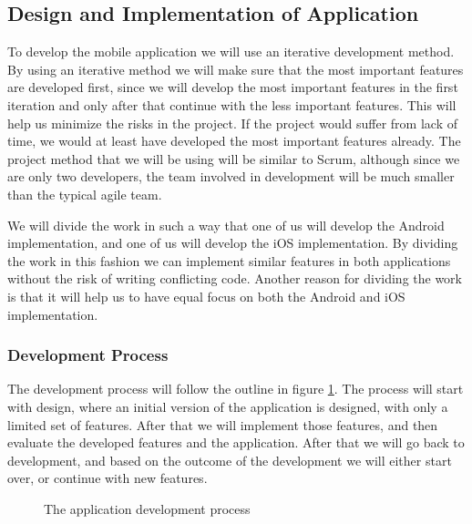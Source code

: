 \documentclass[12pt, a4paper, onecolumn]{article}
\begin{document}
	\subsection{Design and Implementation of Application}
	
	To develop the mobile application we will use an iterative development method. By using an iterative method we will make sure that the most important features are developed first, since we will develop the most important features in the first iteration and only after that continue with the less important features. This will help us  minimize the risks in the project. If the project would suffer from lack of time, we would at least have developed the most important features already. The project method that we will be using will be similar to Scrum, although since we are only two developers, the team involved in development will be much smaller than the typical agile team.
	
	We will divide the work in such a way that one of us will develop the Android implementation, and one of us will develop the iOS implementation. By dividing the work in this fashion we can implement similar features in both applications without the risk of writing conflicting code. Another reason for dividing the work is that it will help us to have equal focus on both the Android and iOS implementation.
	
	\subsubsection{Development Process}
	
	The development process will follow the outline in figure \ref{fig:development}. The process will start with design, where an initial version of the application is designed, with only a limited set of features. After that we will implement those features, and then evaluate the developed features and the application. After that we will go back to development, and based on the outcome of the development we will either start over, or continue with new features.
	
	\begin{figure}[h]
		\centering
		\caption{The application development process}%
		\label{fig:development}%
	\end{figure}
	
\end{document}
